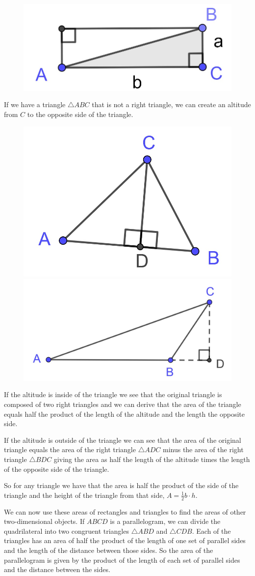 \documentclass[
]{book}
\theoremstyle{definition}
\theoremstyle{definition}
\theoremstyle{definition}
\theoremstyle{definition}
\theoremstyle{remark}
\begin{document}
\begin{figure}

{\centering \includegraphics[width=0.3\linewidth]{images/area_triangle} 

}

\end{figure}

If we have a triangle \(\triangle ABC\) that is not a right triangle, we can create an altitude from \(C\) to the opposite side of the triangle.

\begin{figure}

{\centering \includegraphics[width=0.3\linewidth]{images/area_triangle2} \includegraphics[width=0.3\linewidth]{images/area_triangle4} 

}

\end{figure}

If the altitude is inside of the triangle we see that the original triangle is composed of two right triangles and we can derive that the area of the triangle equals half the product of the length of the altitude and the length the opposite side.

If the altitude is outside of the triangle we can see that the area of the original triangle equals the area of the right triangle \(\triangle ADC\) minus the area of the right triangle \(\triangle BDC\) giving the area as half the length of the altitude times the length of the opposite side of the triangle.

So for any triangle we have that the area is half the product of the side of the triangle and the height of the triangle from that side, \(A = \frac{1}{2} b \cdot h\).

We can now use these areas of rectangles and triangles to find the areas of other two-dimensional objects. If \(ABCD\) is a parallelogram, we can divide the quadrilateral into two congruent triangles \(\triangle ABD\) and \(\triangle CDB\). Each of the triangles has an area of half the product of the length of one set of parallel sides and the length of the distance between those sides. So the area of the parallelogram is given by the product of the length of each set of parallel sides and the distance between the sides.
\end{document}

